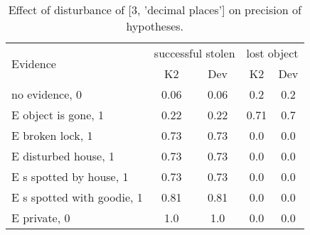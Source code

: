 \begin{table}\begin{tabular}{l|cc|cc}\toprule\multirow{2}{*}{Evidence} & \multicolumn{2}{c}{successful stolen}& \multicolumn{2}{c}{lost object}\\& {K2} & {Dev}& {K2} & {Dev}\\\midrule
no evidence, 0 & 0.06&0.06&0.2&0.2\\E object is gone, 1 & 0.22&0.22&0.71&0.7\\E broken lock, 1 & 0.73&0.73&0.0&0.0\\E disturbed house, 1 & 0.73&0.73&0.0&0.0\\E s spotted by house, 1 & 0.73&0.73&0.0&0.0\\E s spotted with goodie, 1 & 0.81&0.81&0.0&0.0\\E private, 0 & 1.0&1.0&0.0&0.0\\\bottomrule\end{tabular}\caption{Effect of disturbance of [3, 'decimal places'] on precision of hypotheses.}\end{table}